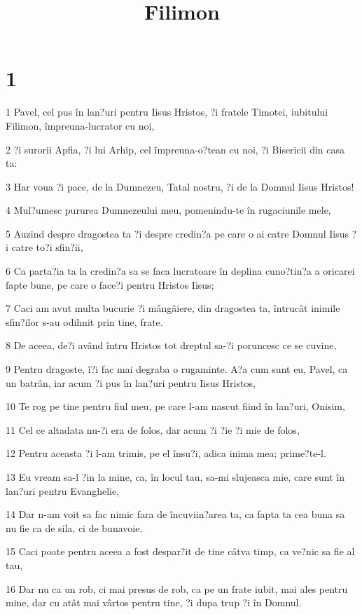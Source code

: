 

\title{Filimon}


\chapter{1}

\par 1 Pavel, cel pus în lan?uri pentru Iisus Hristos, ?i fratele Timotei, iubitului Filimon, împreuna-lucrator cu noi,
\par 2 ?i surorii Apfia, ?i lui Arhip, cel împreuna-o?tean cu noi, ?i Bisericii din casa ta:
\par 3 Har voua ?i pace, de la Dumnezeu, Tatal nostru, ?i de la Domnul Iisus Hristos!
\par 4 Mul?umesc pururea Dumnezeului meu, pomenindu-te în rugaciunile mele,
\par 5 Auzind despre dragostea ta ?i despre credin?a pe care o ai catre Domnul Iisus ?i catre to?i sfin?ii,
\par 6 Ca parta?ia ta la credin?a sa se faca lucratoare în deplina cuno?tin?a a oricarei fapte bune, pe care o face?i pentru Hristos Iisus;
\par 7 Caci am avut multa bucurie ?i mângâiere, din dragostea ta, întrucât inimile sfin?ilor s-au odihnit prin tine, frate.
\par 8 De aceea, de?i având întru Hristos tot dreptul sa-?i poruncesc ce se cuvine,
\par 9 Pentru dragoste, î?i fac mai degraba o rugaminte. A?a cum sunt eu, Pavel, ca un batrân, iar acum ?i pus în lan?uri pentru Iisus Hristos,
\par 10 Te rog pe tine pentru fiul meu, pe care l-am nascut fiind în lan?uri, Onisim,
\par 11 Cel ce altadata nu-?i era de folos, dar acum ?i ?ie ?i mie de folos,
\par 12 Pentru aceasta ?i l-am trimis, pe el însu?i, adica inima mea; prime?te-l.
\par 13 Eu vream sa-l ?in la mine, ca, în locul tau, sa-mi slujeasca mie, care sunt în lan?uri pentru Evanghelie,
\par 14 Dar n-am voit sa fac nimic fara de încuviin?area ta, ca fapta ta cea buna sa nu fie ca de sila, ci de bunavoie.
\par 15 Caci poate pentru aceea a fost despar?it de tine câtva timp, ca ve?nic sa fie al tau,
\par 16 Dar nu ca un rob, ci mai presus de rob, ca pe un frate iubit, mai ales pentru mine, dar cu atât mai vârtos pentru tine, ?i dupa trup ?i în Domnul.
